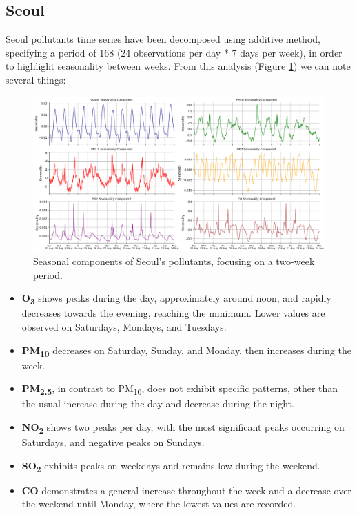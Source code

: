 \subsection{Seoul}
Seoul pollutants time series have been decomposed using additive method, specifying a period of 168 (24 observations per day * 7 days per week), in order to highlight seasonality between weeks.
From this analysis (Figure \ref{fig:seasonality_seoul}) we can note several things:

\begin{figure}[h]
    \centering
    \includegraphics[width=1\linewidth]{images/seoul_seasonality.png}
    \caption{Seasonal components of Seoul's pollutants, focusing on a two-week period.}
    \label{fig:seasonality_seoul}
\end{figure}

\begin{itemize}[noitemsep]
    \item \textbf{O\textsubscript{3}} shows peaks during the day, approximately around noon, and rapidly decreases towards the evening, reaching the minimum. Lower values are observed on Saturdays, Mondays, and Tuesdays.
    \item \textbf{PM\textsubscript{10}} decreases on Saturday, Sunday, and Monday, then increases during the week.
    \item \textbf{PM\textsubscript{2.5}}, in contrast to PM\textsubscript{10}, does not exhibit specific patterns, other than the usual increase during the day and decrease during the night.
    \item \textbf{NO\textsubscript{2}} shows two peaks per day, with the most significant peaks occurring on Saturdays, and negative peaks on Sundays.
    \item \textbf{SO\textsubscript{2}} exhibits peaks on weekdays and remains low during the weekend.
    \item \textbf{CO} demonstrates a general increase throughout the week and a decrease over the weekend until Monday, where the lowest values are recorded.
\end{itemize}

